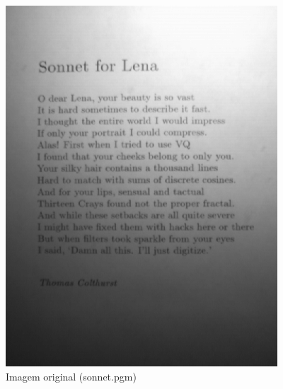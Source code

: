 \documentclass{article}
\begin{document}
\begin{figure}[!htb]
    \begin{minipage}{0.48\textwidth}
      \centering
      \includegraphics[width=.99\linewidth]{sonnet.png}
      \caption{Imagem original (sonnet.pgm)}\label{Fig:soneto1}
    \end{minipage}\hfill
    \begin{minipage}{0.48\textwidth}
      \centering

\end{minipage}
\end{figure}
\end{document}
